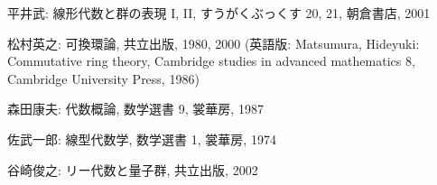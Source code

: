 \documentclass[12pt,twoside]{jarticle}
\begin{document}

\begin{thebibliography}{AB}

平井武: 線形代数と群の表現 I, II, すうがくぶっくす 20, 21, 朝倉書店, 2001



松村英之: 可換環論, 共立出版, 1980, 2000 (英語版: Matsumura, Hideyuki:
Commutative ring theory, Cambridge studies in advanced mathematics 8, 
Cambridge University Press, 1986)

森田康夫: 代数概論, 数学選書 9, 裳華房, 1987



佐武一郎: 線型代数学, 数学選書 1, 裳華房, 1974


谷崎俊之: リー代数と量子群, 共立出版, 2002


\end{thebibliography}

\end{document}
